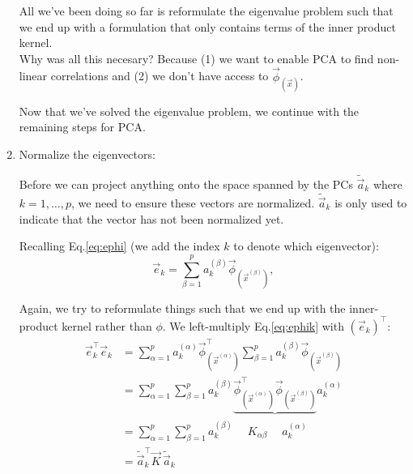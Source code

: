 \begin{enumerate}
All we've been doing so far is reformulate the eigenvalue problem such that we end up 
with a formulation that only contains terms of the inner product kernel.\\
Why was all this necesary? Because (1) we want to enable PCA to find non-linear correlations and (2) we don't have access to $\vec \phi_{(\vec x)}$.

Now that we've solved the eigenvalue problem, we continue with the remaining steps for PCA.

\newpage 
\item Normalize the eigenvectors:

Before we can project anything onto the space spanned by the PCs $\widetilde{\vec a}_k$ where $k=1,\ldots,p$,
we need to ensure these vectors are normalized. 
$\widetilde {\vec a}_k$ is only used to indicate that the vector has not been normalized yet.



Recalling Eq.\ref{eq:ephi} (we add the index $k$ to denote which eigenvector):
\begin{equation}
\label{eq:ephik}
\vec e_k = \sum^{p}_{\beta=1} a_k^{(\beta)} \vec{\phi}_{(\vec{x}^{(\beta)})},
\end{equation}

Again, we try to reformulate things such that we end up with the inner-product kernel rather than $\phi$. 
We left-multiply Eq.\ref{eq:ephik} with $\left(\vec e_k\right)^\top$:
\begin{align}
\vec e^{\top}_k \vec e_k &= \sum^{p}_{\alpha=1}  a_k^{(\alpha)} \vec{\phi}_{(\vec{x}^{(\alpha)})}^\top \sum^{p}_{\beta=1} a_k^{(\beta)} \vec{\phi}_{(\vec{x}^{(\beta)})} \\
&= \sum^{p}_{\alpha=1}  \sum^{p}_{\beta=1}  a_k^{(\beta)}  \underbrace{\vec{\phi}_{(\vec{x}^{(\alpha)})}^\top  \vec{\phi}_{(\vec{x}^{(\beta)})}} a_k^{(\alpha)} \\
&= \sum^{p}_{\alpha=1}  \sum^{p}_{\beta=1}  a_k^{(\beta)} \quad \; K_{\alpha\beta} \quad \; a_k^{(\alpha)} \\
&= \widetilde {\vec a}_k^\top \vec K \, \widetilde {\vec a}_k
\end{align}


\end{enumerate}
